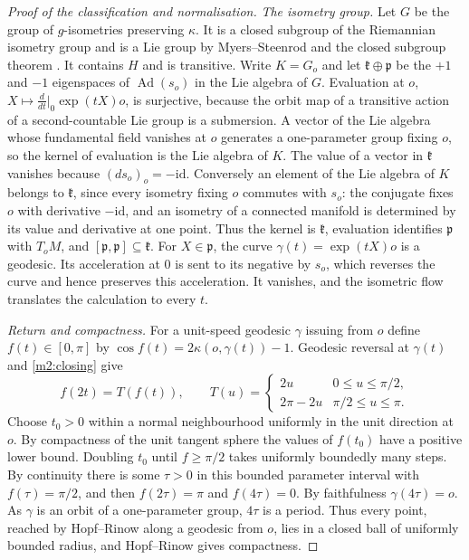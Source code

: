 \documentclass[11pt,reqno]{amsart}
\theoremstyle{definition}
\theoremstyle{remark}
\numberwithin{equation}{section}
\newcommand{\Ad}{\operatorname{Ad}}
\begin{document}
\begin{proof}[Proof of the classification and normalisation]
\emph{The isometry group.}  Let $G$ be the group of $g$-isometries preserving $\kappa$.  It is a closed subgroup of the Riemannian isometry
group and is a Lie group by Myers--Steenrod and the closed subgroup theorem \cite{m2:MyersSteenrod}.  It contains $H$ and is transitive.
Write $K=G_o$ and let $\mathfrak k\oplus\mathfrak p$ be the $+1$ and $-1$ eigenspaces of $\Ad(s_o)$ in the Lie algebra of $G$.  Evaluation
at $o$, $X\mapsto\frac d{dt}\big|_0\exp(tX)o$, is surjective, because the orbit map of a transitive action of a second-countable Lie group
is a submersion.  A vector of the Lie algebra whose fundamental field vanishes at $o$ generates a one-parameter group fixing $o$, so the
kernel of evaluation is the Lie algebra of $K$.  The value of a vector in $\mathfrak k$ vanishes because $(ds_o)_o=-\mathrm{id}$.
Conversely an element of the Lie algebra of $K$ belongs to $\mathfrak k$, since every isometry fixing $o$ commutes with $s_o$: the
conjugate fixes $o$ with derivative $-\mathrm{id}$, and an isometry of a connected manifold is determined by its value and derivative at
one point.  Thus the kernel is $\mathfrak k$, evaluation identifies $\mathfrak p$ with $T_oM$, and
$[\mathfrak p,\mathfrak p]\subseteq\mathfrak k$.  For $X\in\mathfrak p$, the curve $\gamma(t)=\exp(tX)o$ is a geodesic.  Its acceleration
at $0$ is sent to its negative by $s_o$, which reverses the curve and hence preserves this acceleration.  It vanishes, and the isometric
flow translates the calculation to every $t$.

\emph{Return and compactness.}  For a unit-speed geodesic $\gamma$ issuing from $o$ define $f(t)\in[0,\pi]$
by $\cos f(t)=2\kappa(o,\gamma(t))-1$.  Geodesic reversal at $\gamma(t)$ and \eqref{m2:closing} give
\begin{equation}\label{m2:tent}
 f(2t)=T(f(t)),\qquad T(u)=
 \begin{cases}2u&0\le u\le\pi/2,\\2\pi-2u&\pi/2\le u\le\pi.\end{cases}
\end{equation}
Choose $t_0>0$ within a normal neighbourhood uniformly in the unit direction at $o$.  By compactness of the unit tangent sphere the
values of $f(t_0)$ have a positive lower bound.  Doubling $t_0$ until $f\ge\pi/2$ takes uniformly boundedly many steps.  By continuity
there is some $\tau>0$ in this bounded parameter interval with $f(\tau)=\pi/2$, and then $f(2\tau)=\pi$ and $f(4\tau)=0$.  By faithfulness
$\gamma(4\tau)=o$.  As $\gamma$ is an orbit of a one-parameter group, $4\tau$ is a period.  Thus every point, reached by Hopf--Rinow along
a geodesic from $o$, lies in a closed ball of uniformly bounded radius, and Hopf--Rinow gives compactness.


\end{proof}
\end{document}
